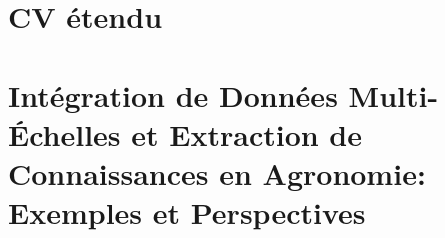 \documentclass[
11pt, %
french, %
singlespacing, %
headsepline, %
]{MastersDoctoralThesis} %
\begin{document}

\mainmatter %

\pagestyle{thesis} %

\part{CV étendu} %
\label{cv} %

%


%
%
\part{Intégration de Données Multi-Échelles et Extraction de Connaissances en Agronomie: Exemples et Perspectives} %
\label{Perspectives}

% 
%
% 
% 
\end{document}
